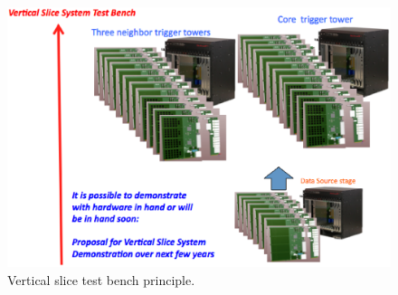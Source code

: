 \begin{figure}[ht!]
\centering
\includegraphics[width=0.8\columnwidth]{Plots/VSTBench.eps}
\caption{Vertical slice test bench principle.}
\label{fig:VS_TBench}
\end{figure}





